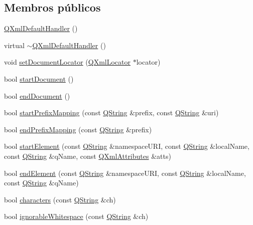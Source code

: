 \subsection*{Membros públicos}
\begin{DoxyCompactItemize}
\item 
\hyperlink{class_q_xml_default_handler_a793125c12ce88b08d70d78e0e6be4c1b}{Q\-Xml\-Default\-Handler} ()
\item 
virtual \hyperlink{class_q_xml_default_handler_a478b1db9349a96d1c2dd83385fbb56e4}{$\sim$\-Q\-Xml\-Default\-Handler} ()
\item 
void \hyperlink{class_q_xml_default_handler_a6ea335308d212e2244af77edaff21d6a}{set\-Document\-Locator} (\hyperlink{class_q_xml_locator}{Q\-Xml\-Locator} $\ast$locator)
\item 
bool \hyperlink{class_q_xml_default_handler_af5342502614ae37eaa64a8d3e404027d}{start\-Document} ()
\item 
bool \hyperlink{class_q_xml_default_handler_aaef0fd8871f28d804dc845c47c8fbc85}{end\-Document} ()
\item 
bool \hyperlink{class_q_xml_default_handler_a95ec522e87375953024f71f04077eafa}{start\-Prefix\-Mapping} (const \hyperlink{class_q_string}{Q\-String} \&prefix, const \hyperlink{class_q_string}{Q\-String} \&uri)
\item 
bool \hyperlink{class_q_xml_default_handler_a12f447f90feb782e1717170190f14ad2}{end\-Prefix\-Mapping} (const \hyperlink{class_q_string}{Q\-String} \&prefix)
\item 
bool \hyperlink{class_q_xml_default_handler_a0712995308713e9df1c0d389568a344b}{start\-Element} (const \hyperlink{class_q_string}{Q\-String} \&namespace\-U\-R\-I, const \hyperlink{class_q_string}{Q\-String} \&local\-Name, const \hyperlink{class_q_string}{Q\-String} \&q\-Name, const \hyperlink{class_q_xml_attributes}{Q\-Xml\-Attributes} \&atts)
\item 
bool \hyperlink{class_q_xml_default_handler_abd6ff9644b2d6f0a4aab938bd9cdc593}{end\-Element} (const \hyperlink{class_q_string}{Q\-String} \&namespace\-U\-R\-I, const \hyperlink{class_q_string}{Q\-String} \&local\-Name, const \hyperlink{class_q_string}{Q\-String} \&q\-Name)
\item 
bool \hyperlink{class_q_xml_default_handler_a6eb7b9d9a6138bf566cc61ae9b5e436a}{characters} (const \hyperlink{class_q_string}{Q\-String} \&ch)
\item 
bool \hyperlink{class_q_xml_default_handler_a12ab56e68ba11fa12a88b869611fa3e3}{ignorable\-Whitespace} (const \hyperlink{class_q_string}{Q\-String} \&ch)

\end{DoxyCompactItemize}
